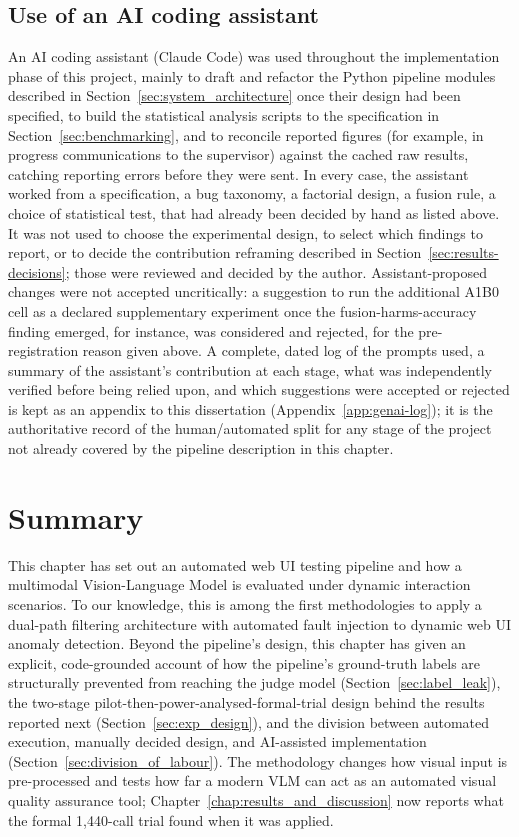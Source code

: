 \subsection{Use of an AI coding assistant}
An AI coding assistant (Claude Code) was used throughout the implementation phase of this project, mainly to draft and refactor the Python pipeline modules described in Section~\ref{sec:system_architecture} once their design had been specified, to build the statistical analysis scripts to the specification in Section~\ref{sec:benchmarking}, and to reconcile reported figures (for example, in progress communications to the supervisor) against the cached raw results, catching reporting errors before they were sent. In every case, the assistant worked from a specification, a bug taxonomy, a factorial design, a fusion rule, a choice of statistical test, that had already been decided by hand as listed above. It was not used to choose the experimental design, to select which findings to report, or to decide the contribution reframing described in Section~\ref{sec:results-decisions}; those were reviewed and decided by the author. Assistant-proposed changes were not accepted uncritically: a suggestion to run the additional A1B0 cell as a declared supplementary experiment once the fusion-harms-accuracy finding emerged, for instance, was considered and rejected, for the pre-registration reason given above. A complete, dated log of the prompts used, a summary of the assistant's contribution at each stage, what was independently verified before being relied upon, and which suggestions were accepted or rejected is kept as an appendix to this dissertation (Appendix~\ref{app:genai-log}); it is the authoritative record of the human/automated split for any stage of the project not already covered by the pipeline description in this chapter.

\section{Summary}
\label{sec:summary}
This chapter has set out an automated web UI testing pipeline and how a multimodal Vision-Language Model is evaluated under dynamic interaction scenarios. To our knowledge, this is among the first methodologies to apply a dual-path filtering architecture with automated fault injection to dynamic web UI anomaly detection. Beyond the pipeline's design, this chapter has given an explicit, code-grounded account of how the pipeline's ground-truth labels are structurally prevented from reaching the judge model (Section~\ref{sec:label_leak}), the two-stage pilot-then-power-analysed-formal-trial design behind the results reported next (Section~\ref{sec:exp_design}), and the division between automated execution, manually decided design, and AI-assisted implementation (Section~\ref{sec:division_of_labour}). The methodology changes how visual input is pre-processed and tests how far a modern VLM can act as an automated visual quality assurance tool; Chapter~\ref{chap:results_and_discussion} now reports what the formal 1{,}440-call trial found when it was applied.
